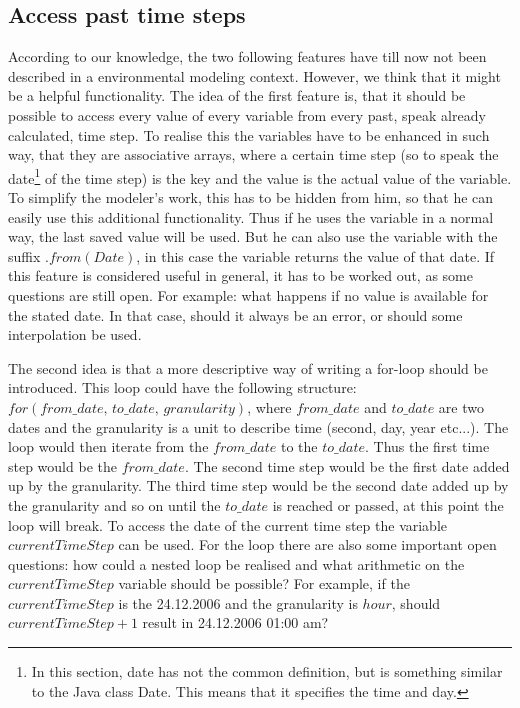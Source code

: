 \subsection{Access past time steps}
\par
According to our knowledge, the two following features have till now not been described in a environmental modeling context. However, we think that it might be a helpful functionality.
The idea of the first feature is, that it should be possible to access every value of every variable from every past, speak already calculated, time step. To realise this the variables have to be enhanced in such way, that they are associative arrays, where a certain time step (so to speak the date\footnote{In this section, date has not the common definition, but is something similar to the Java class Date. This means that it specifies the time and day.} of the time step) is the key and the value is the actual value of the variable. To simplify the modeler’s work, this has to be hidden from him, so that he can easily use this additional functionality. Thus if he uses the variable in a normal way, the last saved value will be used. But he can also use the variable with the suffix $.from(Date)$, in this case the variable returns the value of that date. If this feature is considered useful in general, it has to be worked out, as some questions are still open. For example: what happens if no value is available for the stated date. In that case, should it always be an error, or should some interpolation be used.
\par
The second idea is that a more descriptive way of writing a for-loop should be introduced. This loop could have the following structure:\\
$for(from\_date,\, to\_date,\, granularity)$, where $from\_date$ and $to\_date$ are two dates and the granularity is a unit to describe time (second, day, year etc...). The loop would then iterate from the $from\_date$ to the $to\_date$. Thus the first time step would be the $from\_date$. The second time step would be the first date added up by the granularity. The third time step would be the second date added up by the granularity and so on until the $to\_date$ is reached or passed, at this point the loop will break. To access the date of the current time step the variable $currentTimeStep$ can be used. For the loop there are also some important  open questions: how could a nested loop be realised and what arithmetic on the $currentTimeStep$ variable should be possible? For example, if the $currentTimeStep$ is the 24.12.2006 and the granularity is $hour$, should $currentTimeStep+1$ result in 24.12.2006 01:00 am?
